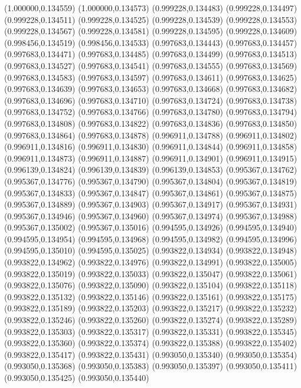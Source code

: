 (1.000000,0.134559)
(1.000000,0.134573)
(0.999228,0.134483)
(0.999228,0.134497)
(0.999228,0.134511)
(0.999228,0.134525)
(0.999228,0.134539)
(0.999228,0.134553)
(0.999228,0.134567)
(0.999228,0.134581)
(0.999228,0.134595)
(0.999228,0.134609)
(0.998456,0.134519)
(0.998456,0.134533)
(0.997683,0.134443)
(0.997683,0.134457)
(0.997683,0.134471)
(0.997683,0.134485)
(0.997683,0.134499)
(0.997683,0.134513)
(0.997683,0.134527)
(0.997683,0.134541)
(0.997683,0.134555)
(0.997683,0.134569)
(0.997683,0.134583)
(0.997683,0.134597)
(0.997683,0.134611)
(0.997683,0.134625)
(0.997683,0.134639)
(0.997683,0.134653)
(0.997683,0.134668)
(0.997683,0.134682)
(0.997683,0.134696)
(0.997683,0.134710)
(0.997683,0.134724)
(0.997683,0.134738)
(0.997683,0.134752)
(0.997683,0.134766)
(0.997683,0.134780)
(0.997683,0.134794)
(0.997683,0.134808)
(0.997683,0.134822)
(0.997683,0.134836)
(0.997683,0.134850)
(0.997683,0.134864)
(0.997683,0.134878)
(0.996911,0.134788)
(0.996911,0.134802)
(0.996911,0.134816)
(0.996911,0.134830)
(0.996911,0.134844)
(0.996911,0.134858)
(0.996911,0.134873)
(0.996911,0.134887)
(0.996911,0.134901)
(0.996911,0.134915)
(0.996139,0.134824)
(0.996139,0.134839)
(0.996139,0.134853)
(0.995367,0.134762)
(0.995367,0.134776)
(0.995367,0.134790)
(0.995367,0.134804)
(0.995367,0.134819)
(0.995367,0.134833)
(0.995367,0.134847)
(0.995367,0.134861)
(0.995367,0.134875)
(0.995367,0.134889)
(0.995367,0.134903)
(0.995367,0.134917)
(0.995367,0.134931)
(0.995367,0.134946)
(0.995367,0.134960)
(0.995367,0.134974)
(0.995367,0.134988)
(0.995367,0.135002)
(0.995367,0.135016)
(0.994595,0.134926)
(0.994595,0.134940)
(0.994595,0.134954)
(0.994595,0.134968)
(0.994595,0.134982)
(0.994595,0.134996)
(0.994595,0.135010)
(0.994595,0.135025)
(0.993822,0.134934)
(0.993822,0.134948)
(0.993822,0.134962)
(0.993822,0.134976)
(0.993822,0.134991)
(0.993822,0.135005)
(0.993822,0.135019)
(0.993822,0.135033)
(0.993822,0.135047)
(0.993822,0.135061)
(0.993822,0.135076)
(0.993822,0.135090)
(0.993822,0.135104)
(0.993822,0.135118)
(0.993822,0.135132)
(0.993822,0.135146)
(0.993822,0.135161)
(0.993822,0.135175)
(0.993822,0.135189)
(0.993822,0.135203)
(0.993822,0.135217)
(0.993822,0.135232)
(0.993822,0.135246)
(0.993822,0.135260)
(0.993822,0.135274)
(0.993822,0.135289)
(0.993822,0.135303)
(0.993822,0.135317)
(0.993822,0.135331)
(0.993822,0.135345)
(0.993822,0.135360)
(0.993822,0.135374)
(0.993822,0.135388)
(0.993822,0.135402)
(0.993822,0.135417)
(0.993822,0.135431)
(0.993050,0.135340)
(0.993050,0.135354)
(0.993050,0.135368)
(0.993050,0.135383)
(0.993050,0.135397)
(0.993050,0.135411)
(0.993050,0.135425)
(0.993050,0.135440)
